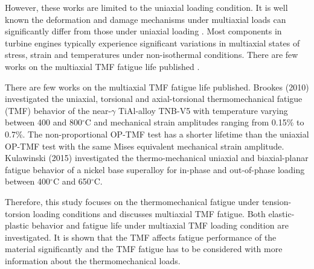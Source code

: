 However, these works are limited to the uniaxial loading condition.
It is well known the deformation and damage mechanisms under multiaxial loads can significantly differ from those under uniaxial loading \cite{fang2015cyclic, kang2004uniaxial, chen2004modified}. Most components in turbine engines typically experience significant variations in multiaxial states of stress, strain and temperatures under non-isothermal conditions. There are few works on the multiaxial TMF fatigue life published \cite{Brookes2010}.

There are few works on the multiaxial TMF fatigue life published.
Brookes (2010) \cite{brookes2010axial} investigated the uniaxial, torsional and axial-torsional thermomechanical fatigue (TMF) behavior of the near-$\gamma$ TiAl-alloy TNB-V5 with temperature varying between 400 and 800$^{\circ}$C and mechanical strain amplitudes ranging from 0.15\% to 0.7\%. The non-proportional OP-TMF test has a shorter lifetime than the uniaxial OP-TMF test with the same Mises equivalent mechanical strain amplitude.
Kulawinski (2015) \cite{Kulawinski201521} investigated the thermo-mechanical uniaxial and biaxial-planar fatigue behavior of a nickel base superalloy for in-phase and out-of-phase loading between 400$^{\circ}$C and 650$^{\circ}$C.

Therefore, this study focuses on the thermomechanical fatigue under tension-torsion loading conditions and discusses multiaxial TMF fatigue. Both elastic-plastic behavior and fatigue life under multiaxial TMF loading condition are investigated. It is shown that the TMF affects fatigue performance of the material significantly and the TMF fatigue has to be considered with more information about the thermomechanical loads.

